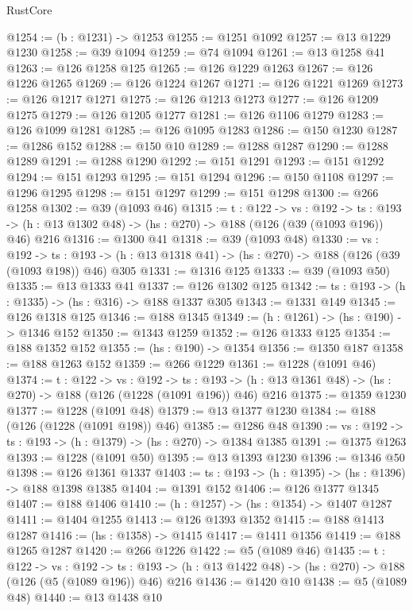 \begin{lexlean}{RustCore}
\begin{coremodule}
@1254 := (b : @1231) -> @1253
@1255 := @1251 @1092
@1257 := @13 @1229 @1230
@1258 := @39 @1094
@1259 := @74 @1094
@1261 := @13 @1258 @41
@1263 := @126 @1258 @125
@1265 := @126 @1229 @1263
@1267 := @126 @1226 @1265
@1269 := @126 @1224 @1267
@1271 := @126 @1221 @1269
@1273 := @126 @1217 @1271
@1275 := @126 @1213 @1273
@1277 := @126 @1209 @1275
@1279 := @126 @1205 @1277
@1281 := @126 @1106 @1279
@1283 := @126 @1099 @1281
@1285 := @126 @1095 @1283
@1286 := @150 @1230
@1287 := @1286 @152
@1288 := @150 @10
@1289 := @1288 @1287
@1290 := @1288 @1289
@1291 := @1288 @1290
@1292 := @151 @1291
@1293 := @151 @1292
@1294 := @151 @1293
@1295 := @151 @1294
@1296 := @150 @1108
@1297 := @1296 @1295
@1298 := @151 @1297
@1299 := @151 @1298
@1300 := @266 @1258
@1302 := @39 (@1093 @46)
@1315 := {t : @122} ->
  {vs : @192} ->
  {ts : @193} -> (h : @13 @1302 @48) -> (hs : @270) -> @188 (@126 (@39 (@1093 @196)) @46) @216
@1316 := @1300 @41
@1318 := @39 (@1093 @48)
@1330 := {vs : @192} ->
  {ts : @193} -> (h : @13 @1318 @41) -> (hs : @270) -> @188 (@126 (@39 (@1093 @198)) @46) @305
@1331 := @1316 @125
@1333 := @39 (@1093 @50)
@1335 := @13 @1333 @41
@1337 := @126 @1302 @125
@1342 := {ts : @193} -> (h : @1335) -> (hs : @316) -> @188 @1337 @305
@1343 := @1331 @149
@1345 := @126 @1318 @125
@1346 := @188 @1345
@1349 := (h : @1261) -> (hs : @190) -> @1346 @152
@1350 := @1343 @1259
@1352 := @126 @1333 @125
@1354 := @188 @1352 @152
@1355 := (hs : @190) -> @1354
@1356 := @1350 @187
@1358 := @188 @1263 @152
@1359 := @266 @1229
@1361 := @1228 (@1091 @46)
@1374 := {t : @122} ->
  {vs : @192} ->
  {ts : @193} -> (h : @13 @1361 @48) -> (hs : @270) -> @188 (@126 (@1228 (@1091 @196)) @46) @216
@1375 := @1359 @1230
@1377 := @1228 (@1091 @48)
@1379 := @13 @1377 @1230
@1384 := @188 (@126 (@1228 (@1091 @198)) @46)
@1385 := @1286 @48
@1390 := {vs : @192} -> {ts : @193} -> (h : @1379) -> (hs : @270) -> @1384 @1385
@1391 := @1375 @1263
@1393 := @1228 (@1091 @50)
@1395 := @13 @1393 @1230
@1396 := @1346 @50
@1398 := @126 @1361 @1337
@1403 := {ts : @193} -> (h : @1395) -> (hs : @1396) -> @188 @1398 @1385
@1404 := @1391 @152
@1406 := @126 @1377 @1345
@1407 := @188 @1406
@1410 := (h : @1257) -> (hs : @1354) -> @1407 @1287
@1411 := @1404 @1255
@1413 := @126 @1393 @1352
@1415 := @188 @1413 @1287
@1416 := (hs : @1358) -> @1415
@1417 := @1411 @1356
@1419 := @188 @1265 @1287
@1420 := @266 @1226
@1422 := @5 (@1089 @46)
@1435 := {t : @122} ->
  {vs : @192} ->
  {ts : @193} -> (h : @13 @1422 @48) -> (hs : @270) -> @188 (@126 (@5 (@1089 @196)) @46) @216
@1436 := @1420 @10
@1438 := @5 (@1089 @48)
@1440 := @13 @1438 @10

\end{coremodule}
\end{lexlean}
